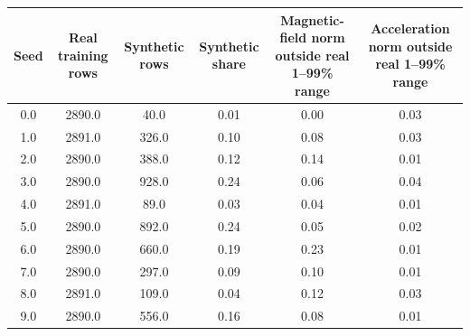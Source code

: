 \begin{tabular}{cccccc}
\toprule
Seed & Real training rows & Synthetic rows & Synthetic share & Magnetic-field norm outside real 1--99\% range & Acceleration norm outside real 1--99\% range \\
\midrule
0.0 & 2890.0 & 40.0 & 0.01 & 0.00 & 0.03 \\
1.0 & 2891.0 & 326.0 & 0.10 & 0.08 & 0.03 \\
2.0 & 2890.0 & 388.0 & 0.12 & 0.14 & 0.01 \\
3.0 & 2890.0 & 928.0 & 0.24 & 0.06 & 0.04 \\
4.0 & 2891.0 & 89.0 & 0.03 & 0.04 & 0.01 \\
5.0 & 2890.0 & 892.0 & 0.24 & 0.05 & 0.02 \\
6.0 & 2890.0 & 660.0 & 0.19 & 0.23 & 0.01 \\
7.0 & 2890.0 & 297.0 & 0.09 & 0.10 & 0.01 \\
8.0 & 2891.0 & 109.0 & 0.04 & 0.12 & 0.03 \\
9.0 & 2890.0 & 556.0 & 0.16 & 0.08 & 0.01 \\
\bottomrule
\end{tabular}

